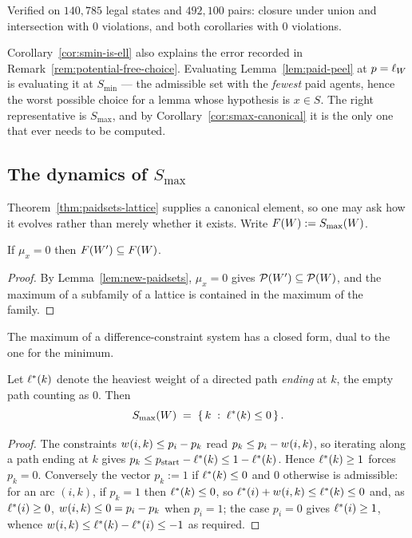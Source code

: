 Verified on $140{,}785$ legal states and $492{,}100$ pairs: closure under union
and intersection with $0$ violations, and both corollaries with $0$ violations.

Corollary~\ref{cor:smin-is-ell} also explains the error recorded in
Remark~\ref{rem:potential-free-choice}. Evaluating Lemma~\ref{lem:paid-peel} at
$p = \ell_{W}$ is evaluating it at $S_{\min}$ --- the admissible set
with the \emph{fewest} paid agents, hence the worst possible choice for a lemma
whose hypothesis is $x \in S$. The right representative is $S_{\max}$, and by
Corollary~\ref{cor:smax-canonical} it is the only one that ever needs to be
computed.

\subsection{The dynamics of \texorpdfstring{$S_{\max}$}{Smax}}
\label{sec:smax-dynamics}

Theorem~\ref{thm:paidsets-lattice} supplies a canonical element, so one may ask
how it evolves rather than merely whether it exists. Write
$F(W) := S_{\max}(W)$.

\begin{proposition}
\label{prop:smax-monotone-mu0}
If $\mu_x = 0$ then $F(W') \subseteq F(W)$.
\end{proposition}

\begin{proof}
By Lemma~\ref{lem:new-paidsets}, $\mu_x = 0$ gives
$\mathcal{P}(W') \subseteq \mathcal{P}(W)$, and the maximum of a
subfamily of a lattice is contained in the maximum of the family.
\end{proof}

The maximum of a difference-constraint system has a closed form, dual to the one
for the minimum.

\begin{proposition}
\label{prop:smax-closed-form}
Let $\ell^{\ast}(k)$ denote the heaviest weight of a directed path \emph{ending} at
$k$, the empty path counting as $0$. Then
\[
  S_{\max}(W) \;=\; \left\{\, k \;:\; \ell^{\ast}(k) \le 0 \,\right\}.
\]
\end{proposition}

\begin{proof}
The constraints $w_{}(i,k) \le p_i - p_k$ read $p_k \le p_i - w_{}(i,k)$,
so iterating along a path ending at $k$ gives $p_k \le p_{\text{start}} -
\ell^{\ast}(k) \le 1 - \ell^{\ast}(k)$. Hence $\ell^{\ast}(k) \ge 1$ forces $p_k = 0$.
Conversely the vector $p_k := 1$ if $\ell^{\ast}(k) \le 0$ and $0$ otherwise is
admissible: for an arc $(i,k)$, if $p_k = 1$ then $\ell^{\ast}(k) \le 0$, so
$\ell^{\ast}(i) + w_{}(i,k) \le \ell^{\ast}(k) \le 0$ and, as $\ell^{\ast}(i) \ge 0$,
$w_{}(i,k) \le 0 = p_i - p_k$ when $p_i = 1$; the case $p_i = 0$ gives
$\ell^{\ast}(i) \ge 1$, whence $w_{}(i,k) \le \ell^{\ast}(k) - \ell^{\ast}(i) \le -1$
as required.
\end{proof}


